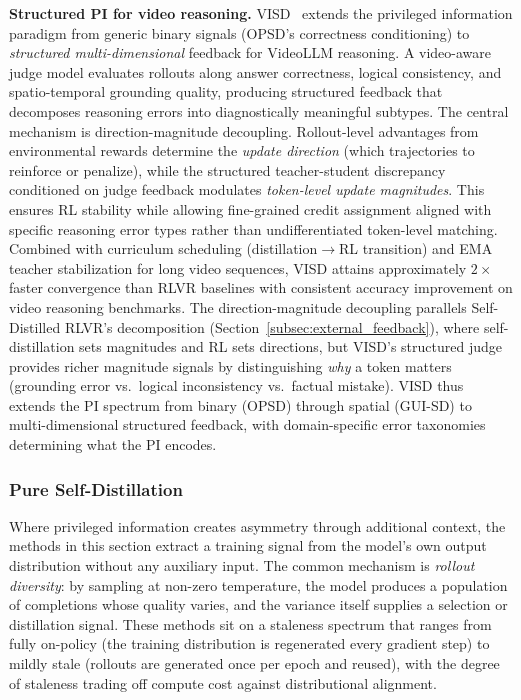 \documentclass{article} %
\begin{document}
\textbf{Structured PI for video reasoning.} VISD~\citep{lin2026visd} extends the privileged information paradigm from generic binary signals (OPSD's correctness conditioning) to \emph{structured multi-dimensional} feedback for VideoLLM reasoning. A video-aware judge model evaluates rollouts along answer correctness, logical consistency, and spatio-temporal grounding quality, producing structured feedback that decomposes reasoning errors into diagnostically meaningful subtypes. The central mechanism is direction-magnitude decoupling. Rollout-level advantages from environmental rewards determine the \emph{update direction} (which trajectories to reinforce or penalize), while the structured teacher-student discrepancy conditioned on judge feedback modulates \emph{token-level update magnitudes}. This ensures RL stability while allowing fine-grained credit assignment aligned with specific reasoning error types rather than undifferentiated token-level matching. Combined with curriculum scheduling (distillation$\to$RL transition) and EMA teacher stabilization for long video sequences, VISD attains approximately $2\times$ faster convergence than RLVR baselines with consistent accuracy improvement on video reasoning benchmarks. The direction-magnitude decoupling parallels Self-Distilled RLVR's decomposition (Section~\ref{subsec:external_feedback}), where self-distillation sets magnitudes and RL sets directions, but VISD's structured judge provides richer magnitude signals by distinguishing \emph{why} a token matters (grounding error vs.\ logical inconsistency vs.\ factual mistake). VISD thus extends the PI spectrum from binary (OPSD) through spatial (GUI-SD) to multi-dimensional structured feedback, with domain-specific error taxonomies determining what the PI encodes.

\subsubsection{Pure Self-Distillation}
\label{subsec:self_play}

Where privileged information creates asymmetry through additional context, the methods in this section extract a training signal from the model's own output distribution without any auxiliary input. The common mechanism is \emph{rollout diversity}: by sampling at non-zero temperature, the model produces a population of completions whose quality varies, and the variance itself supplies a selection or distillation signal. These methods sit on a staleness spectrum that ranges from fully on-policy (the training distribution is regenerated every gradient step) to mildly stale (rollouts are generated once per epoch and reused), with the degree of staleness trading off compute cost against distributional alignment.
\end{document}
